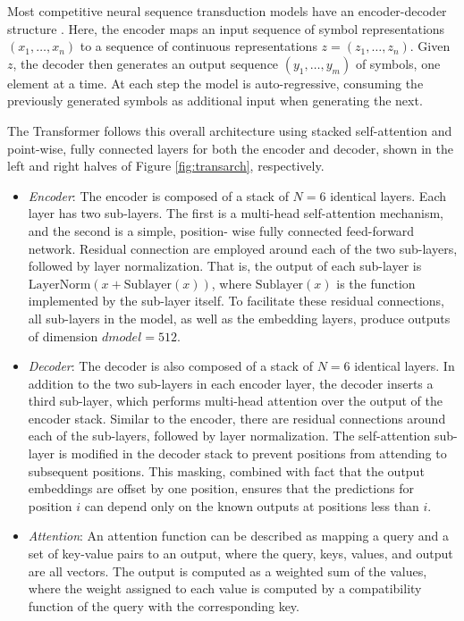 Most competitive neural sequence transduction models have an encoder-decoder structure \cite{trans2}.
Here, the encoder maps an input sequence of symbol representations $(x_1, \ldots, x_n)$ to a sequence
of continuous representations $z = (z_1, \ldots, z_n)$. Given $z$, the decoder then generates an output
sequence $(y_1, \ldots, y_m)$ of symbols, one element at a time. At each step the model is auto-regressive, consuming the previously generated symbols as additional input when generating the next.

The Transformer follows this overall architecture using stacked self-attention and point-wise, fully
connected layers for both the encoder and decoder, shown in the left and right halves of Figure \ref{fig:transarch}, respectively.

\begin{itemize}
	\item \textit{Encoder}: The encoder is composed of a stack of $N = 6$
	      identical layers. Each layer has two
	      sub-layers. The first is a multi-head self-attention mechanism\cite{attention}, and the second is a simple, position-
	      wise fully connected feed-forward network. Residual connection
	      are employed around each of
	      the two sub-layers, followed by layer normalization. That is, the output of each sub-layer is
	      $\text{LayerNorm}(x + \text{Sublayer}(x))$, where $\text{Sublayer}(x)$ is the function implemented by the sub-layer
	      itself. To facilitate these residual connections, all sub-layers in the model, as well as the embedding
	      layers, produce outputs of dimension $dmodel = 512$.

	\item \textit{Decoder}: The decoder is also composed of a stack of $N = 6$
	      identical layers. In addition to the two
	      sub-layers in each encoder layer, the decoder inserts a third sub-layer, which performs multi-head
	      attention over the output of the encoder stack. Similar to the encoder, there are residual connections
	      around each of the sub-layers, followed by layer normalization. The self-attention sub-layer is modified in the decoder stack to prevent positions from attending to subsequent positions. This
	      masking\cite{attention}, combined with fact that the output embeddings are offset by one position, ensures that the
	      predictions for position $i$ can depend only on the known outputs at positions less than $i$.

	\item \textit{Attention}: An attention\cite{attention} function can be described as
	      mapping a query and a set of key-value pairs to an output,
	      where the query, keys, values, and output are all vectors\cite{trans1}. The output is computed as a weighted sum of the values, where the weight assigned to each value is computed by a compatibility function of the
	      query with the corresponding key\cite{attention}.
\end{itemize}

